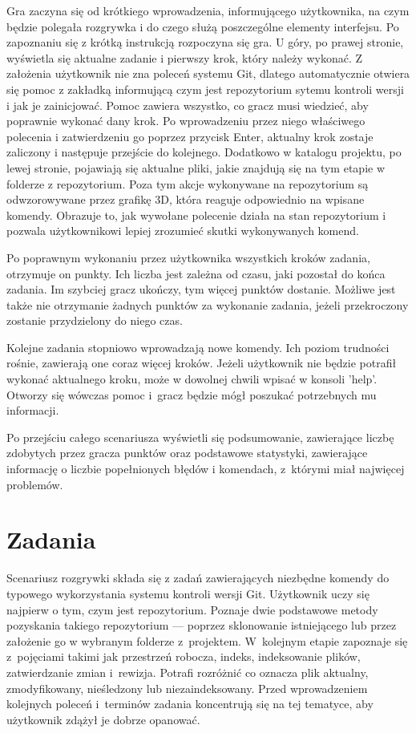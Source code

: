 \documentclass[11pt,a4paper,polish,thesis]{dcsbook}
\begin{document}
	Gra zaczyna się od krótkiego wprowadzenia, informującego użytkownika, na czym będzie polegała rozgrywka i do czego służą poszczególne elementy interfejsu. Po zapoznaniu się z krótką instrukcją rozpoczyna się gra. U góry, po prawej stronie, wyświetla się aktualne zadanie i pierwszy krok, który należy wykonać. Z założenia użytkownik nie zna poleceń systemu Git, dlatego automatycznie otwiera się pomoc z zakładką informującą czym jest repozytorium sytemu kontroli wersji i jak je zainicjować. Pomoc zawiera wszystko, co gracz musi wiedzieć, aby poprawnie wykonać dany krok. Po wprowadzeniu przez niego właściwego polecenia i zatwierdzeniu go poprzez przycisk Enter, aktualny krok zostaje zaliczony i następuje przejście do kolejnego. Dodatkowo w katalogu projektu, po lewej stronie, pojawiają się aktualne pliki, jakie znajdują się na tym etapie w folderze z repozytorium. Poza tym akcje wykonywane na repozytorium są odwzorowywane przez grafikę 3D, która reaguje odpowiednio na wpisane komendy. Obrazuje to, jak wywołane polecenie działa na stan repozytorium i pozwala użytkownikowi lepiej zrozumieć skutki wykonywanych komend. 
	
	Po poprawnym wykonaniu przez użytkownika wszystkich kroków zadania, otrzymuje on punkty. Ich liczba jest zależna od czasu, jaki pozostał do końca zadania. Im szybciej gracz ukończy, tym więcej punktów dostanie. Możliwe jest także nie otrzymanie żadnych punktów za wykonanie zadania, jeżeli przekroczony zostanie przydzielony do niego czas. 
	
	Kolejne zadania stopniowo wprowadzają nowe komendy. Ich poziom trudności rośnie, zawierają one coraz więcej kroków. Jeżeli użytkownik nie będzie potrafił wykonać aktualnego kroku, może w dowolnej chwili wpisać w konsoli 'help'. Otworzy się wówczas pomoc i~gracz będzie mógł poszukać potrzebnych mu informacji. 
	
	Po przejściu całego scenariusza wyświetli się podsumowanie, zawierające liczbę zdobytych przez gracza punktów oraz podstawowe statystyki, zawierające informację o liczbie popełnionych błędów i komendach, z~którymi miał najwięcej problemów. 
	
	\section{Zadania}
	
	Scenariusz rozgrywki składa się z zadań zawierających niezbędne komendy do typowego wykorzystania systemu kontroli wersji Git. Użytkownik uczy się najpierw o tym, czym jest repozytorium. Poznaje dwie podstawowe metody pozyskania takiego repozytorium --- poprzez sklonowanie istniejącego lub przez założenie go w wybranym folderze z~projektem. W~kolejnym etapie zapoznaje się z~pojęciami takimi jak przestrzeń robocza, indeks, indeksowanie plików, zatwierdzanie zmian i~rewizja. Potrafi rozróżnić co oznacza plik aktualny, zmodyfikowany, nieśledzony lub niezaindeksowany. Przed wprowadzeniem kolejnych poleceń i~terminów zadania koncentrują się na tej tematyce, aby użytkownik zdążył je dobrze opanować. 
	
\end{document}
